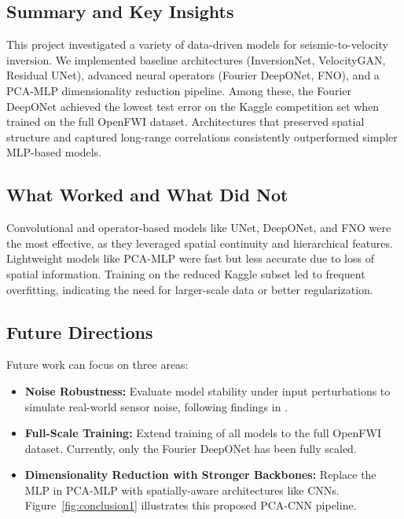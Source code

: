 \documentclass{article}
\begin{document}
\subsection{Summary and Key Insights}

This project investigated a variety of data-driven models for seismic-to-velocity inversion. We implemented baseline architectures (InversionNet, VelocityGAN, Residual UNet), advanced neural operators (Fourier DeepONet, FNO), and a PCA-MLP dimensionality reduction pipeline. Among these, the Fourier DeepONet achieved the lowest test error on the Kaggle competition set when trained on the full OpenFWI dataset. Architectures that preserved spatial structure and captured long-range correlations consistently outperformed simpler MLP-based models.

\subsection{What Worked and What Did Not}

Convolutional and operator-based models like UNet, DeepONet, and FNO were the most effective, as they leveraged spatial continuity and hierarchical features. Lightweight models like PCA-MLP were fast but less accurate due to loss of spatial information. Training on the reduced Kaggle subset led to frequent overfitting, indicating the need for larger-scale data or better regularization.

\subsection{Future Directions}

Future work can focus on three areas:
\begin{itemize}[leftmargin=*, itemsep=1pt, topsep=2pt]
    \item \textbf{Noise Robustness:} Evaluate model stability under input perturbations to simulate real-world sensor noise, following findings in \cite{fdonet}.
    \item \textbf{Full-Scale Training:} Extend training of all models to the full OpenFWI dataset. Currently, only the Fourier DeepONet has been fully scaled.
    \item \textbf{Dimensionality Reduction with Stronger Backbones:} Replace the MLP in PCA-MLP with spatially-aware architectures like CNNs. Figure~\ref{fig:conclusion1} illustrates this proposed PCA-CNN pipeline.
\end{itemize}
\end{document}
